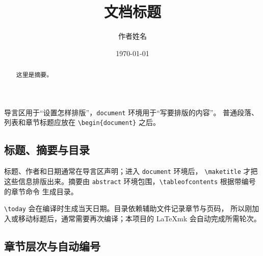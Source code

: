 \begin{warningbox}
导言区用于“设置怎样排版”，\texttt{document} 环境用于“写要排版的内容”。
普通段落、列表和章节标题应放在 \texttt{\textbackslash begin\{document\}} 之后。
\end{warningbox}

\subsection{标题、摘要与目录}

标题、作者和日期通常在导言区声明；进入 \texttt{document} 环境后，
\texttt{\textbackslash maketitle} 才把这些信息排版出来。摘要由
\texttt{abstract} 环境包围，\texttt{\textbackslash tableofcontents} 根据带编号的章节命令
生成目录。

\begin{codeblock}
\title{文档标题}
\author{作者姓名}
\date{\today}


\maketitle
\begin{abstract}
这里是摘要。
\end{abstract}
\tableofcontents

\end{codeblock}

\texttt{\textbackslash today} 会在编译时生成当天日期。目录依赖辅助文件记录章节与页码，
所以刚加入或移动标题后，通常需要再次编译；本项目的 LaTeXmk 会自动完成所需轮次。

\subsection{章节层次与自动编号}

